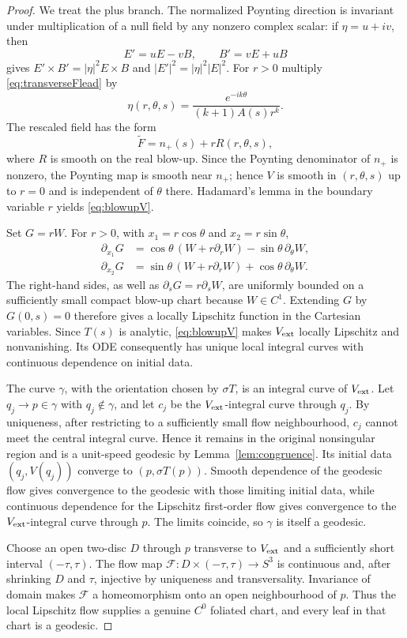 \documentclass[aps,prd,reprint,nofootinbib,superscriptaddress]{revtex4-2}
\theoremstyle{definition}
\theoremstyle{remark}
\begin{document}
\begin{proof}
We treat the plus branch. The normalized Poynting direction is invariant under multiplication of a null field by any nonzero complex scalar: if $\eta=u+iv$, then
\[
E'=uE-vB,\qquad B'=vE+uB
\]
gives $E'\times B'=|\eta|^2E\times B$ and $|E'|^2=|\eta|^2|E|^2$. For $r>0$ multiply \eqref{eq:transverseFlead} by
\[
\eta(r,\theta,s)=\frac{e^{-ik\theta}}{(k+1)A(s)r^k}.
\]
The rescaled field has the form
\[
\widetilde F=n_+(s)+rR(r,\theta,s),
\]
where $R$ is smooth on the real blow-up. Since the Poynting denominator of $n_+$ is nonzero, the Poynting map is smooth near $n_+$; hence $V$ is smooth in $(r,\theta,s)$ up to $r=0$ and is independent of $\theta$ there. Hadamard's lemma in the boundary variable $r$ yields \eqref{eq:blowupV}.

Set $G=rW$.  For $r>0$, with $x_1=r\cos\theta$ and $x_2=r\sin\theta$,
\begin{align}
\partial_{x_1}G
&=\cos\theta\,(W+r\partial_rW)-\sin\theta\,\partial_\theta W,\nonumber\\
\partial_{x_2}G
&=\sin\theta\,(W+r\partial_rW)+\cos\theta\,\partial_\theta W.
\label{eq:Lipschitzderivatives}
\end{align}
The right-hand sides, as well as $\partial_sG=r\partial_sW$, are uniformly bounded on a sufficiently small compact blow-up chart because $W\in C^1$.  Extending $G$ by $G(0,s)=0$ therefore gives a locally Lipschitz function in the Cartesian variables.  Since $T(s)$ is analytic, \eqref{eq:blowupV} makes $V_{\rm ext}$ locally Lipschitz and nonvanishing.  Its ODE consequently has unique local integral curves with continuous dependence on initial data.

The curve $\gamma$, with the orientation chosen by $\sigma T$, is an integral curve of $V_{\rm ext}$. Let $q_j\to p\in\gamma$ with $q_j\notin\gamma$, and let $c_j$ be the $V_{\rm ext}$-integral curve through $q_j$. By uniqueness, after restricting to a sufficiently small flow neighbourhood, $c_j$ cannot meet the central integral curve. Hence it remains in the original nonsingular region and is a unit-speed geodesic by Lemma~\ref{lem:congruence}. Its initial data $(q_j,V(q_j))$ converge to $(p,\sigma T(p))$. Smooth dependence of the geodesic flow gives convergence to the geodesic with those limiting initial data, while continuous dependence for the Lipschitz first-order flow gives convergence to the $V_{\rm ext}$-integral curve through $p$. The limits coincide, so $\gamma$ is itself a geodesic.

Choose an open two-disc $D$ through $p$ transverse to $V_{\rm ext}$ and a sufficiently short interval $(-\tau,\tau)$.  The flow map $\mathcal F:D\times(-\tau,\tau)\to S^3$ is continuous and, after shrinking $D$ and $\tau$, injective by uniqueness and transversality.  Invariance of domain makes $\mathcal F$ a homeomorphism onto an open neighbourhood of $p$.  Thus the local Lipschitz flow supplies a genuine $C^0$ foliated chart, and every leaf in that chart is a geodesic.
\end{proof}
\end{document}
